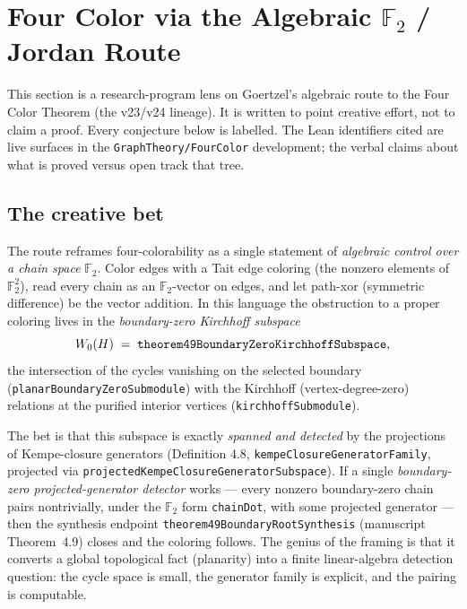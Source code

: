 \section{Four Color via the Algebraic $\mathbb{F}_2$ / Jordan Route}
\label{sec:goertzel-4cp-state}

This section is a research-program lens on Goertzel's algebraic route to the
Four Color Theorem (the v23/v24 lineage). It is written to point creative
effort, not to claim a proof. Every conjecture below is labelled. The Lean
identifiers cited are live surfaces in the \texttt{GraphTheory/FourColor}
development; the verbal claims about what is proved versus open track that tree.

\subsection{The creative bet}

The route reframes four-colorability as a single statement of \emph{algebraic
control over a chain space} $\mathbb{F}_2$. Color edges with a Tait edge
coloring (the nonzero elements of $\mathbb{F}_2^2$), read every chain as an
$\mathbb{F}_2$-vector on edges, and let path-xor (symmetric difference) be the
vector addition. In this language the obstruction to a proper coloring lives in
the \emph{boundary-zero Kirchhoff subspace}
\[
  W_0(H) \;=\; \verb|theorem49BoundaryZeroKirchhoffSubspace|,
\]
the intersection of the cycles vanishing on the selected boundary
(\verb|planarBoundaryZeroSubmodule|) with the Kirchhoff (vertex-degree-zero)
relations at the purified interior vertices (\verb|kirchhoffSubmodule|).

The bet is that this subspace is exactly \emph{spanned and detected} by the
projections of Kempe-closure generators (Definition 4.8,
\verb|kempeClosureGeneratorFamily|, projected via
\verb|projectedKempeClosureGeneratorSubspace|). If a single
\emph{boundary-zero projected-generator detector} works --- every nonzero
boundary-zero chain pairs nontrivially, under the $\mathbb{F}_2$ form
\verb|chainDot|, with some projected generator --- then the synthesis endpoint
\verb|theorem49BoundaryRootSynthesis| (manuscript Theorem~4.9) closes and the
coloring follows. The genius of the framing is that it converts a global
topological fact (planarity) into a finite linear-algebra detection question:
the cycle space is small, the generator family is explicit, and the pairing is
computable.

